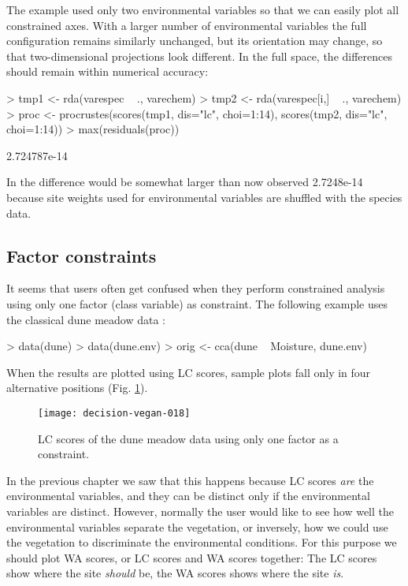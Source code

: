 \documentclass[a4paper,10pt,twocolumn]{article}
\begin{document}
The example used only two environmental variables so that we can
easily plot all constrained axes.  With a larger number of
environmental variables the full configuration remains similarly
unchanged, but its orientation may change, so that two-dimensional
projections look different.  In the full space, the differences should
remain within numerical accuracy:
\begin{Schunk}
\begin{Sinput}
> tmp1 <- rda(varespec ~ ., varechem)
> tmp2 <- rda(varespec[i,] ~ ., varechem)
> proc <- procrustes(scores(tmp1, dis="lc", choi=1:14), 
                     scores(tmp2, dis="lc", choi=1:14))
> max(residuals(proc))
\end{Sinput}
\begin{Soutput}
[1] 2.724787e-14
\end{Soutput}
\end{Schunk}
In  the difference would be somewhat larger than now
observed 2.7248e-14 because site
weights used for environmental variables are shuffled with the species
data.

\subsection{Factor constraints}

It seems that users often get confused when they perform constrained
analysis using  only one factor (class variable) as constraint.  The
following example uses the classical dune meadow data \cite{Jongman87}:
\begin{Schunk}
\begin{Sinput}
> data(dune)
> data(dune.env)
> orig <- cca(dune ~ Moisture, dune.env)
\end{Sinput}
\end{Schunk}
When the results are plotted using LC scores, sample plots fall only
in four alternative positions (Fig. \ref{fig:factorlc}).
\begin{figure}
\texttt{[image: decision-vegan-018]}
\caption{LC scores of the dune meadow data using only one factor as a
  constraint.}
\label{fig:factorlc}
\end{figure}
In the previous chapter we saw that this happens because LC scores
\emph{are} the environmental variables, and they can be distinct only
if the environmental variables are distinct.  However, normally the user
would like to see how well the environmental variables separate the
vegetation, or inversely, how we could use the vegetation to
discriminate the environmental conditions.  For this purpose we should
plot WA scores, or LC scores and WA scores together:  The LC scores
show where the site \emph{should} be, the WA scores shows where the
site \emph{is}.
\end{document}
